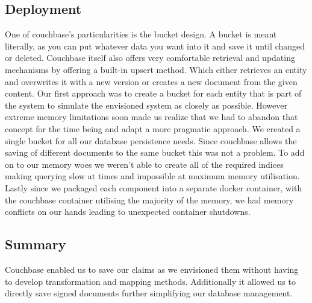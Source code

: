 \subsection{Deployment}
\label{ssec:databaseDeployment}
One of couchbase's particularities is the bucket design.
A bucket is meant literally, as you can put whatever data you want into it and save it until changed or deleted.
Couchbase itself also offers very comfortable retrieval and updating mechanisms by
offering a built-in upsert method. Which either retrieves an entity and overwrites it with a new version or creates
a new document from the given content.
Our first approach was to create a bucket for each entity that is part of the system to simulate the envisioned
system as closely as possible. However extreme memory limitations soon made us realize that we had to abandon that
concept for the time being and adapt a more pragmatic approach.
We created a single bucket for all our database persistence needs. Since couchbase allows the saving of different
documents to the same bucket this was not a problem.
To add on to our memory woes we weren't able to create all of the required indices making querying slow at times and
impossible at maximum memory utilisation.
Lastly since we packaged each component into a separate docker container, with the couchbase container utilising the
majority of the memory, we had memory conflicts on our hands leading to unexpected container shutdowns.

\subsection{Summary}
\label{sec:databaseSummary}
Couchbase enabled us to save our claims as we envisioned them without having to develop transformation and mapping methods.
Additionally it allowed us to directly save signed documents further simplifying our database management.
